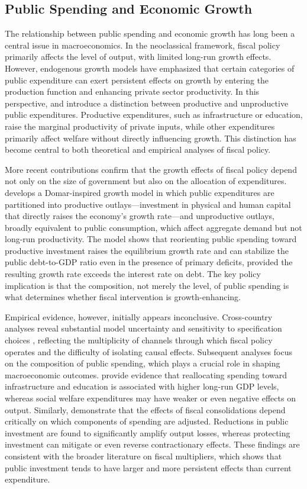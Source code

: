 \documentclass[11pt,english,a4paper, twoside, authoryear]{article}
\begin{document}
\subsection{Public Spending and Economic Growth}

The relationship between public spending and economic growth has long been a central issue in macroeconomics. In the neoclassical framework, fiscal policy primarily affects the level of output, with limited long-run growth effects. However, endogenous growth models have emphasized that certain categories of public expenditure can exert persistent effects on growth by entering the production function and enhancing private sector productivity. In this perspective, \citet{Barro1990} and \citet{Devarajan1996} introduce a distinction between productive and unproductive public expenditures. Productive expenditures, such as infrastructure or education, raise the marginal productivity of private inputs, while other expenditures primarily affect welfare without directly influencing growth. This distinction has become central to both theoretical and empirical analyses of fiscal policy.

More recent contributions confirm that the growth effects of fiscal policy depend not only on the size of government but also on the allocation of expenditures. \citet{Sardoni2024} develops a Domar-inspired growth model in which public expenditures are partitioned into productive outlays---investment in physical and human capital that directly raises the economy's growth rate---and unproductive outlays, broadly equivalent to public consumption, which affect aggregate demand but not long-run productivity. The model shows that reorienting public spending toward productive investment raises the equilibrium growth rate and can stabilize the public debt-to-GDP ratio even in the presence of primary deficits, provided the resulting growth rate exceeds the interest rate on debt. The key policy implication is that the composition, not merely the level, of public spending is what determines whether fiscal intervention is growth-enhancing.

Empirical evidence, however, initially appears inconclusive. Cross-country analyses reveal substantial model uncertainty and sensitivity to specification choices \citep{MoralBenito2012}, reflecting the multiplicity of channels through which fiscal policy operates and the difficulty of isolating causal effects. Subsequent analyses focus on the composition of public spending, which plays a crucial role in shaping macroeconomic outcomes. \citet{Gemmell2016} provide evidence that reallocating spending toward infrastructure and education is associated with higher long-run GDP levels, whereas social welfare expenditures may have weaker or even negative effects on output. Similarly, \citet{Ardanaz2021} demonstrate that the effects of fiscal consolidations depend critically on which components of spending are adjusted. Reductions in public investment are found to significantly amplify output losses, whereas protecting investment can mitigate or even reverse contractionary effects. These findings are consistent with the broader literature on fiscal multipliers, which shows that public investment tends to have larger and more persistent effects than current expenditure.
\end{document}
